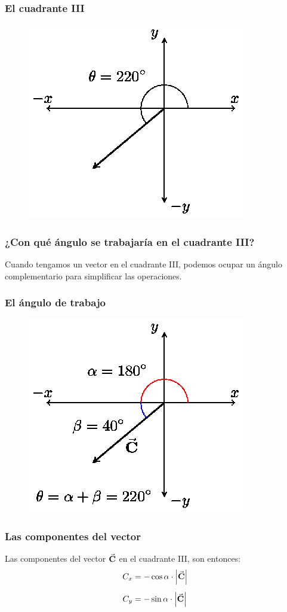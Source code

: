 \documentclass[14pt]{beamer}
\begin{document}
\begin{frame}
\frametitle{El cuadrante III}
\begin{figure}
    \centering
    \includegraphics[scale=1.25]{Imagenes/Componentes_Vector_08.eps}
\end{figure}
\end{frame}
\begin{frame}
\frametitle{¿Con qué ángulo se trabajaría en el cuadrante III?}
Cuando tengamos un vector en el cuadrante III, podemos ocupar un ángulo complementario para simplificar las operaciones.
\end{frame}
\begin{frame}
\frametitle{El ángulo de trabajo}
\begin{figure}
    \centering
    \includegraphics[scale=1.3]{Imagenes/Componentes_Vector_08a.eps}
\end{figure}
\end{frame}
\begin{frame}
\frametitle{Las componentes del vector}
Las componentes del vector $\va{C}$ en el cuadrante III, son entonces:
\begin{align*}
C_{x} & = - \cos \alpha \cdot \abs{\va{C}} \\[0.5em]
C_{y} & = - \sin \alpha \cdot \abs{\va{C}}
\end{align*}
\end{frame}
\end{document}
